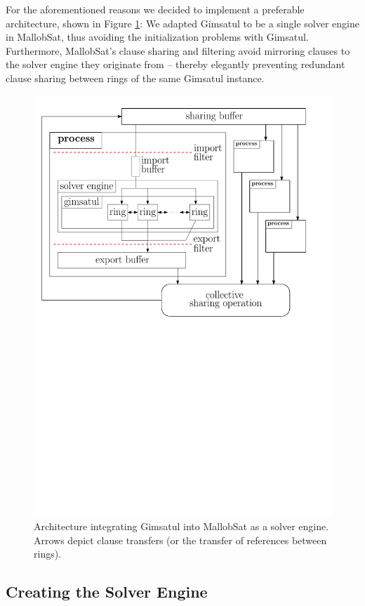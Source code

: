 \documentclass[12pt,a4paper,twoside]{scrartcl}
\numberwithin{equation}{section}
\begin{document}
For the aforementioned reasons we decided to implement a preferable architecture, shown in Figure \ref{fig:architecture}: We adapted Gimsatul to be a single solver engine in MallobSat, thus avoiding the initialization problems with Gimsatul. Furthermore, MallobSat's clause sharing and filtering avoid mirroring clauses to the solver engine they originate from -- thereby elegantly preventing redundant clause sharing between rings of the same Gimsatul instance.

\begin{figure}
  \center
  \includegraphics[scale=.8]{figures/architecture.pdf}
  \caption{Architecture integrating Gimsatul into MallobSat as a solver engine. Arrows depict clause transfers (or the transfer of references between rings).}
  \label{fig:architecture}
\end{figure}

\subsection{Creating the Solver Engine}
\end{document}
